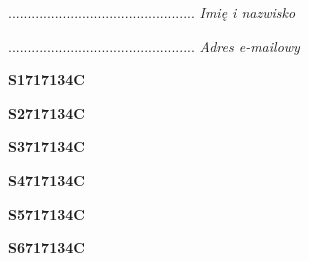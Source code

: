 \begin{turn}{90}\begin{minipage}{\linewidth} \vspace{20mm} ................................................  \textit{Imię i nazwisko}\end{minipage}\end{turn}

\begin{turn}{90}\begin{minipage}{\linewidth} \vspace{20mm} ................................................  \textit{Adres e-mailowy}\end{minipage}\end{turn}

\begin{turn}{90}\huge \begin{minipage}{\linewidth} \vspace{10mm}\textbf{S1717134C}\end{minipage}\end{turn}

\begin{turn}{90}\huge \begin{minipage}{\linewidth} \vspace{10mm}\textbf{S2717134C}\end{minipage}\end{turn}

\begin{turn}{90}\huge \begin{minipage}{\linewidth} \vspace{10mm}\textbf{S3717134C}\end{minipage}\end{turn}

\begin{turn}{90}\huge \begin{minipage}{\linewidth} \vspace{10mm}\textbf{S4717134C}\end{minipage}\end{turn}

\begin{turn}{90}\huge \begin{minipage}{\linewidth} \vspace{10mm}\textbf{S5717134C}\end{minipage}\end{turn}

\begin{turn}{90}\huge \begin{minipage}{\linewidth} \vspace{10mm}\textbf{S6717134C}\end{minipage}\end{turn}

